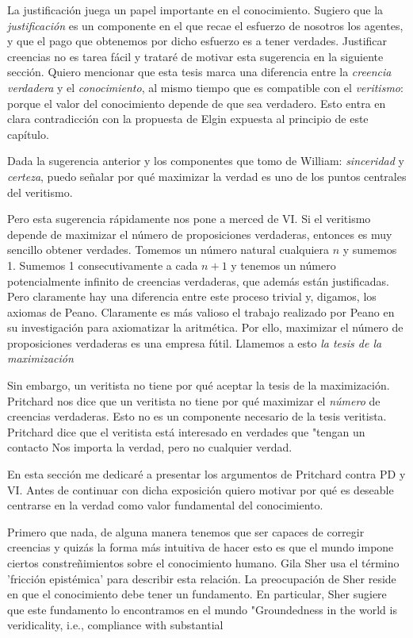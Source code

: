{{{La justificación juega un papel importante en el conocimiento.
Sugiero que la \emph{justificación} es un componente en el que recae el esfuerzo de nosotros los agentes, y que el pago que obtenemos por dicho esfuerzo es a tener verdades.
Justificar creencias no es tarea fácil y trataré de motivar esta sugerencia en la siguiente sección.
Quiero mencionar que esta tesis marca una diferencia entre la \emph{creencia verdadera} y el \emph{conocimiento}, al mismo tiempo que es compatible con el \emph{veritismo}: porque el valor del conocimiento depende de que sea verdadero.
Esto entra en clara contradicción con la propuesta de Elgin expuesta al principio de este capítulo.

Dada la sugerencia anterior y los componentes que tomo de William: \emph{sinceridad} y \emph{certeza}, puedo señalar por qué maximizar la verdad es uno de los puntos centrales del veritismo.

Pero esta sugerencia rápidamente nos pone a merced de VI.
Si el veritismo depende de maximizar el número de proposiciones verdaderas, entonces es muy sencillo obtener verdades.
Tomemos un número natural cualquiera $n$ y sumemos 1.
Sumemos 1 consecutivamente a cada $n+1$ y tenemos un número potencialmente infinito de creencias verdaderas, que además están justificadas.
Pero claramente hay una diferencia entre este proceso trivial y, digamos, los axiomas de Peano.
Claramente es más valioso el trabajo realizado por Peano en su investigación para axiomatizar la aritmética.
Por ello, maximizar el número de proposiciones verdaderas es una empresa fútil.
Llamemos a esto \emph{la tesis de la maximización}

Sin embargo, un veritista no tiene por qué aceptar la tesis de la maximización. Pritchard nos dice que un veritista no tiene por qué maximizar el \emph{número} de creencias verdaderas.
Esto no es un componente necesario de la tesis veritista.
Pritchard dice que el veritista está interesado en verdades que "tengan un contacto %
Nos importa la verdad, pero no cualquier verdad.

En esta sección me dedicaré a presentar los argumentos de Pritchard contra PD y VI. Antes de continuar con dicha exposición quiero motivar por qué es deseable centrarse en la verdad como valor fundamental del conocimiento.

Primero que nada, de alguna manera tenemos que ser capaces de corregir creencias y quizás la forma más intuitiva de hacer esto es que el mundo impone ciertos constreñimientos sobre el conocimiento humano.
Gila Sher usa el término 'fricción epistémica' para describir esta relación.
La preocupación de Sher reside en que el conocimiento debe tener un fundamento.
En particular, Sher sugiere que este fundamento lo encontramos en el mundo "Groundedness in the world is veridicality, i.e., compliance with substantial %

}}}
